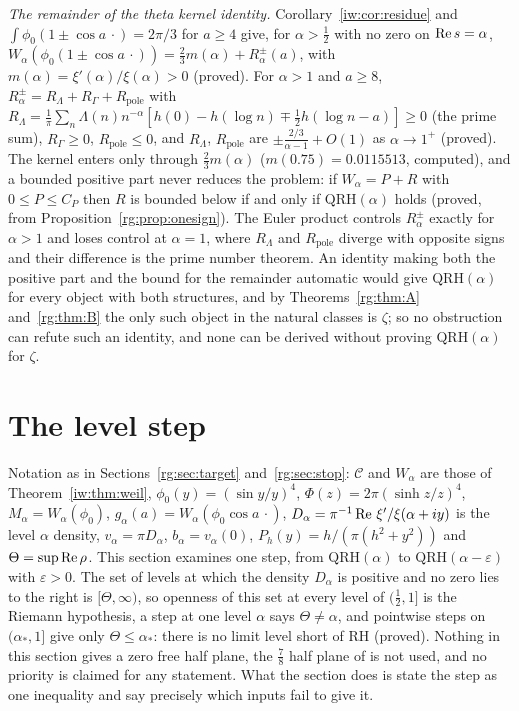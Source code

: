 \emph{The remainder of the theta kernel identity.} Corollary~\ref{iw:cor:residue} and $\int\phi_0(1\pm\cos a\,\cdot)=2\pi/3$ for $a\ge4$ give, for $\alpha>\frac12$ with no zero on $\operatorname{Re} s=\alpha$, $W_\alpha(\phi_0(1\pm\cos a\,\cdot))=\frac23m(\alpha)+R^\pm_\alpha(a)$, with $m(\alpha)=\xi'(\alpha)/\xi(\alpha)>0$ (proved). For $\alpha>1$ and $a\ge8$, $R^\pm_\alpha=R_\Lambda+R_\Gamma+R_{\mathrm{pole}}$ with $R_\Lambda=\frac1\pi\sum_n\Lambda(n)n^{-\alpha}[h(0)-h(\log n)\mp\frac12h(\log n-a)]\ge0$ (the prime sum), $R_\Gamma\ge0$, $R_{\mathrm{pole}}\le0$, and $R_\Lambda$, $R_{\mathrm{pole}}$ are $\pm\frac{2/3}{\alpha-1}+O(1)$ as $\alpha\to1^+$ (proved). The kernel enters only through $\frac23m(\alpha)$ ($m(0.75)=0.0115513$, computed), and a bounded positive part never reduces the problem: if $W_\alpha=P+R$ with $0\le P\le C_P$ then $R$ is bounded below if and only if $\mathrm{QRH}(\alpha)$ holds (proved, from Proposition~\ref{rg:prop:onesign}). The Euler product controls $R^\pm_\alpha$ exactly for $\alpha>1$ and loses control at $\alpha=1$, where $R_\Lambda$ and $R_{\mathrm{pole}}$ diverge with opposite signs and their difference is the prime number theorem. An identity making both the positive part and the bound for the remainder automatic would give $\mathrm{QRH}(\alpha)$ for every object with both structures, and by Theorems~\ref{rg:thm:A} and~\ref{rg:thm:B} the only such object in the natural classes is $\zeta$; so no obstruction can refute such an identity, and none can be derived without proving $\mathrm{QRH}(\alpha)$ for $\zeta$.

\section{The level step}\label{rg:sec:level}

Notation as in Sections~\ref{rg:sec:target} and~\ref{rg:sec:stop}: $\mathcal C$ and $W_\alpha$ are those of Theorem~\ref{iw:thm:weil}, $\phi_0(y)=(\sin y/y)^4$, $\Phi(z)=2\pi(\sinh z/z)^4$, $M_\alpha=W_\alpha(\phi_0)$, $g_\alpha(a)=W_\alpha(\phi_0\cos a\,\cdot)$, $D_\alpha=\pi^{-1}\operatorname{Re}\,\xi'/\xi(\alpha+iy)$ is the level $\alpha$ density, $v_\alpha=\pi D_\alpha$, $b_\alpha=v_\alpha(0)$, $P_h(y)=h/(\pi(h^2+y^2))$ and $\Theta=\sup\operatorname{Re}\rho$. This section examines one step, from $\mathrm{QRH}(\alpha)$ to $\mathrm{QRH}(\alpha-\varepsilon)$ with $\varepsilon>0$. The set of levels at which the density $D_\alpha$ is positive and no zero lies to the right is $[\Theta,\infty)$, so openness of this set at every level of $(\frac12,1]$ is the Riemann hypothesis, a step at one level $\alpha$ says $\Theta\ne\alpha$, and pointwise steps on $(\alpha_*,1]$ give only $\Theta\le\alpha_*$: there is no limit level short of RH (proved). Nothing in this section gives a zero free half plane, the $\frac78$ half plane of \cite{OAI26a} is not used, and no priority is claimed for any statement. What the section does is state the step as one inequality and say precisely which inputs fail to give it.

